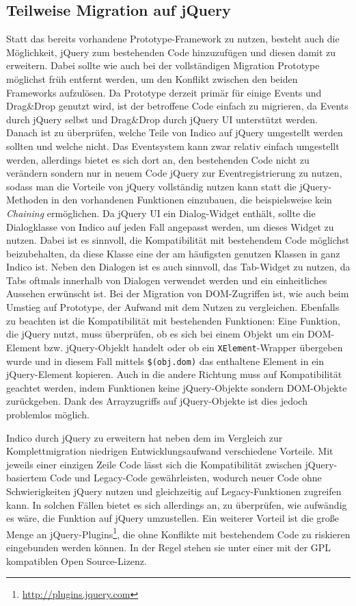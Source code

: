 \subsection{Teilweise Migration auf jQuery}
Statt das bereits vorhandene Prototype-Framework zu nutzen, besteht auch die Möglichkeit, jQuery zum
bestehenden Code hinzuzufügen und diesen damit zu erweitern. Dabei sollte wie auch bei der
vollständigen Migration Prototype möglichst früh entfernt werden, um den Konflikt zwischen den
beiden Frameworks aufzulösen. Da Prototype derzeit primär für einige Events und Drag\&Drop genutzt
wird, ist der betroffene Code einfach zu migrieren, da Events durch jQuery selbst und Drag\&Drop
durch jQuery UI unterstützt werden. Danach ist zu überprüfen, welche Teile von Indico auf jQuery
umgestellt werden sollten und welche nicht. Das Eventsystem kann zwar relativ einfach umgestellt
werden, allerdings bietet es sich dort an, den bestehenden Code nicht zu verändern sondern nur in
neuem Code jQuery zur Eventregistrierung zu nutzen, sodass man die Vorteile von jQuery vollständig
nutzen kann statt die jQuery-Methoden in den vorhandenen Funktionen einzubauen, die beispielsweise
kein \emph{Chaining} ermöglichen. Da jQuery UI ein Dialog-Widget enthält, sollte die Dialogklasse von
Indico auf jeden Fall angepasst werden, um dieses Widget zu nutzen. Dabei ist es sinnvoll, die
Kompatibilität mit bestehendem Code möglichst beizubehalten, da diese Klasse eine der am häufigsten
genutzen Klassen in ganz Indico ist. Neben den Dialogen ist es auch sinnvoll, das Tab-Widget zu
nutzen, da Tabs oftmals innerhalb von Dialogen verwendet werden und ein einheitliches Aussehen
erwünscht ist. Bei der Migration von DOM-Zugriffen ist, wie auch beim Umstieg auf Prototype, der
Aufwand mit dem Nutzen zu vergleichen. Ebenfalls zu beachten ist die Kompatibilität mit bestehenden
Funktionen: Eine Funktion, die jQuery nutzt, muss überprüfen, ob es sich bei einem Objekt um ein
DOM-Element bzw. jQuery-Objeklt handelt oder ob ein \lstinline{XElement}-Wrapper übergeben wurde und
in diesem Fall mittels \lstinline{$(obj.dom)} das enthaltene Element in ein jQuery-Element
kopieren. Auch in die andere Richtung muss auf Kompatibilität geachtet werden, indem Funktionen keine
jQuery-Objekte sondern DOM-Objekte zurückgeben. Dank des Arrayzugriffs auf jQuery-Objekte ist dies
jedoch problemlos möglich.

Indico durch jQuery zu erweitern hat neben dem im Vergleich zur Komplettmigration niedrigen
Entwicklungsaufwand verschiedene Vorteile. Mit jeweils einer einzigen Zeile Code lässt sich die
Kompatibilität zwischen jQuery-basiertem Code und Legacy-Code gewährleisten, wodurch neuer Code ohne
Schwierigkeiten jQuery nutzen und gleichzeitig auf Legacy-Funktionen zugreifen kann. In solchen
Fällen bietet es sich allerdings an, zu überprüfen, wie aufwändig es wäre, die Funktion auf jQuery
umzustellen. Ein weiterer Vorteil ist die große Menge an
jQuery-Plugins\footnote{\href{http://plugins.jquery.com}{http://plugins.jquery.com}}, die ohne
Konflikte mit bestehendem Code zu riskieren eingebunden werden können. In der Regel stehen sie
unter einer mit der GPL kompatiblen Open Source-Lizenz.



